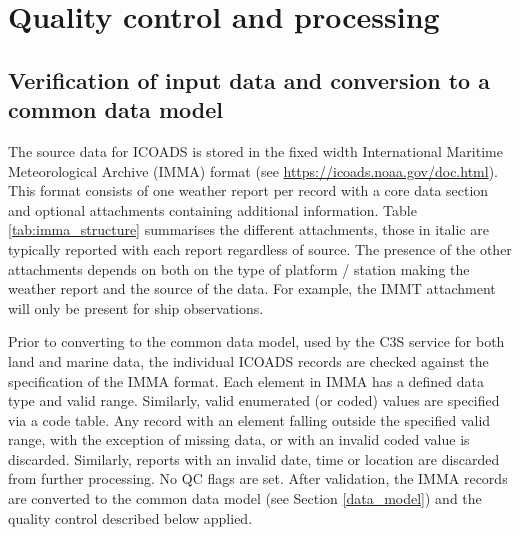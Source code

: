 \section{Quality control and processing} \label{processing}
\subsection{Verification of input data and conversion to a common data model}\label{format-check}
The source data for ICOADS is stored in the fixed width International Maritime Meteorological Archive (IMMA) format (see \url{https://icoads.noaa.gov/doc.html}). 
This format consists of one weather report per record with a core data section and optional attachments containing additional information.
Table \ref{tab:imma_structure} summarises the different attachments, those in italic are typically reported with each report regardless of source. 
The presence of the other attachments depends on both on the type of platform / station making the weather report and the source of the data. 
For example, the IMMT attachment will only be present for ship observations.

Prior to converting to the common data model, used by the C3S service for both land and marine data, the individual ICOADS records are checked against the specification of the IMMA format. 
Each element in IMMA has a defined data type and valid range. 
Similarly, valid enumerated (or coded) values are specified via a code table.
Any record with an element falling outside the specified valid range, with the exception of missing data, or with an invalid coded value is discarded.
Similarly, reports with an invalid date, time or location are discarded from further processing. No QC flags are set.
After validation, the IMMA records are converted to the common data model (see Section \ref{data_model}) and the quality control described below applied.

